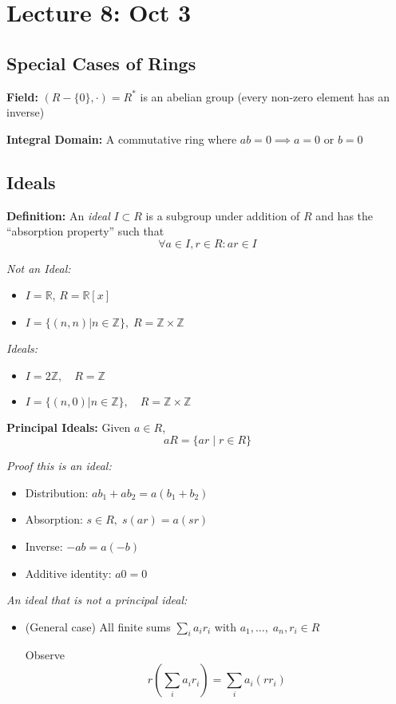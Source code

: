\documentclass[12pt]{report}
\newcommand{\R}{\mathbb{R}}
\newcommand{\Z}{\mathbb{Z}}
\begin{document}
\section*{Lecture 8: Oct 3}
\subsection*{Special Cases of Rings}
\textbf{Field:} $(R - \{0\}, \cdot) = R^*$ is an abelian group (every non-zero element has an inverse)

\textbf{Integral Domain:} A commutative ring where $ab = 0 \implies a = 0 \text{ or } b = 0$

\subsection*{Ideals}
\textbf{Definition:} An \emph{ideal} $I \subset R$ is a subgroup under addition of $R$ and has the ``absorption property'' such that 
\[\forall a \in I, r \in R: ar \in I \]

\emph{Not an Ideal:} 
\begin{itemize}
    \item $I = \R$, $R = \R[x]$
    \item $I = \{(n, n) \big\vert n\in \Z\}, \; R = \Z \times \Z$
\end{itemize}

\emph{Ideals:}
\begin{itemize}
    \item $I = 2\Z, \quad R = \Z$
    \item $I = \{(n, 0) \big\vert n \in \Z\}, \quad R = \Z \times \Z$
\end{itemize}
\vspace{0.25in}

\textbf{Principal Ideals:} Given $a \in R$, 
\[aR = \{ar \; | \; r \in R\}\]

\emph{Proof this is an ideal:}
\begin{itemize}
    \item Distribution: $ab_1 + ab_2 = a(b_1 + b_2)$
    \item Absorption: $s \in R, \; s(ar) = a(sr)$
    \item Inverse: $-ab = a(-b)$
    \item Additive identity: $a0 = 0$
\end{itemize}

\emph{An ideal that is not a principal ideal:}
\begin{itemize}
    \item (General case) All finite sums $\sum_i a_i r_i$ with $a_1, \dots, \; a_n, r_i \in R$ 
    
    Observe 
    \[r\left(\sum_i a_i r_i\right) = \sum_i a_i (rr_i)\]

\end{itemize}
\end{document}
